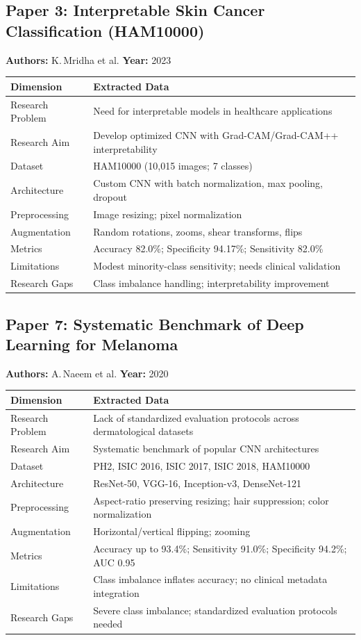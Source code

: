 \documentclass[11pt,a4paper]{article}
\begin{document}
\subsection{Paper 3: Interpretable Skin Cancer Classification (HAM10000)}
\textbf{Authors:} K.\,Mridha et al. \hfill \textbf{Year:} 2023

\begin{tabularx}{\textwidth}{@{}L{4.2cm}X@{}}
\toprule
\textbf{Dimension} & \textbf{Extracted Data} \\
\midrule
Research Problem & Need for interpretable models in healthcare applications \\
Research Aim & Develop optimized CNN with Grad-CAM/Grad-CAM++ interpretability \\
Dataset & HAM10000 (10,015 images; 7 classes) \\
Architecture & Custom CNN with batch normalization, max pooling, dropout \\
Preprocessing & Image resizing; pixel normalization \\
Augmentation & Random rotations, zooms, shear transforms, flips \\
Metrics & Accuracy 82.0\%; Specificity 94.17\%; Sensitivity 82.0\% \\
Limitations & Modest minority-class sensitivity; needs clinical validation \\
Research Gaps & Class imbalance handling; interpretability improvement \\
\bottomrule
\end{tabularx}

\subsection{Paper 7: Systematic Benchmark of Deep Learning for Melanoma}
\textbf{Authors:} A.\,Naeem et al. \hfill \textbf{Year:} 2020

\begin{tabularx}{\textwidth}{@{}L{4.2cm}X@{}}
\toprule
\textbf{Dimension} & \textbf{Extracted Data} \\
\midrule
Research Problem & Lack of standardized evaluation protocols across dermatological datasets \\
Research Aim & Systematic benchmark of popular CNN architectures \\
Dataset & PH2, ISIC 2016, ISIC 2017, ISIC 2018, HAM10000 \\
Architecture & ResNet-50, VGG-16, Inception-v3, DenseNet-121 \\
Preprocessing & Aspect-ratio preserving resizing; hair suppression; color normalization \\
Augmentation & Horizontal/vertical flipping; zooming \\
Metrics & Accuracy up to 93.4\%; Sensitivity 91.0\%; Specificity 94.2\%; AUC 0.95 \\
Limitations & Class imbalance inflates accuracy; no clinical metadata integration \\
Research Gaps & Severe class imbalance; standardized evaluation protocols needed \\
\bottomrule
\end{tabularx}
\end{document}
